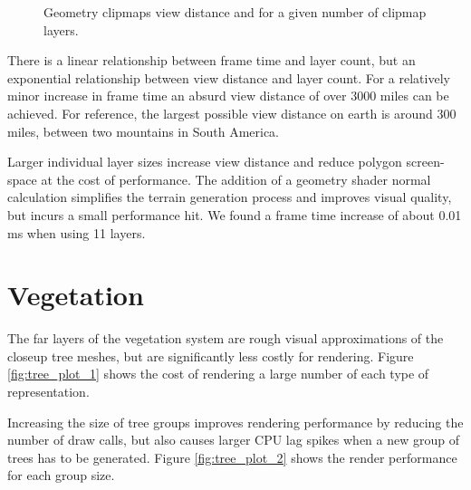 \begin{figure}
	\centering
{}
	\caption{
		Geometry clipmaps view distance and for a given number of clipmap layers.
	}
	\label{fig:clipmaps_plot_2}
\end{figure}

There is a linear relationship between frame time and layer count, but an exponential relationship between view distance and layer count.
For a relatively minor increase in frame time an absurd view distance of over 3000 miles can be achieved.
For reference, the largest possible view distance on earth is around 300 miles, between two mountains in South America. \cite{viewdistancemaxearth}

Larger individual layer sizes increase view distance and reduce polygon screen-space at the cost of performance.
The addition of a geometry shader normal calculation simplifies the terrain generation process and improves visual quality, but incurs a small performance hit.
We found a frame time increase of about 0.01 ms when using 11 layers.


\section{Vegetation}

The far layers of the vegetation system are rough visual approximations of the closeup tree meshes, but are significantly less costly for rendering.
Figure \ref{fig:tree_plot_1} shows the cost of rendering a large number of each type of representation.

Increasing the size of tree groups improves rendering performance by reducing the number of draw calls, but also causes larger CPU lag spikes when a new group of trees has to be generated.
Figure \ref{fig:tree_plot_2} shows the render performance for each group size.

